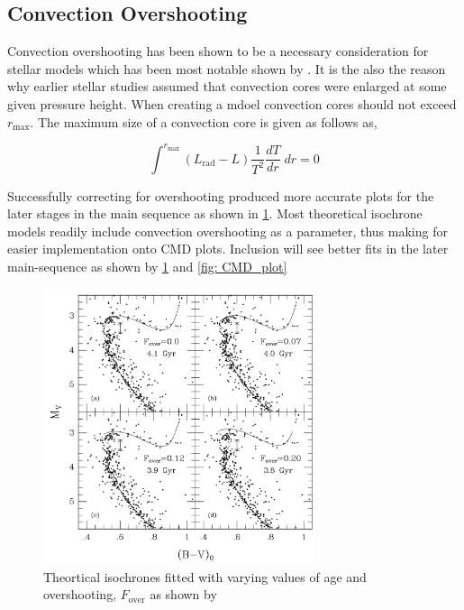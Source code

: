 \subsection{Convection Overshooting} \label{sec: convection_overshooting}

Convection overshooting has been shown to be a necessary consideration for stellar models which has been most notable shown by \cite{Overshooting_Vandenberg}. It is the also the reason why earlier stellar studies assumed that convection cores were enlarged at some given pressure height. When creating a mdoel convection cores should not exceed $r_{\text{max}}$. The maximum size of a convection core is given as follows as, 

\begin{equation}
    \int^{r_{\text{max}}} (L_{\text{rad}} - L) \frac{1}{T^2} \frac{dT}{dr} \; dr = 0 
\end{equation}

Successfully correcting for overshooting produced more accurate plots for the later stages in the main sequence as shown in \cref{fig: convection_overshooting}. Most theoretical isochrone models readily include convection overshooting as a parameter, thus making for easier implementation onto CMD plots. Inclusion will see better fits in the later main-sequence as shown by \cref{fig: convection_overshooting} and \cref{fig: CMD_plot}

\begin{figure}[h!]
    \centering
    \includegraphics[width = 8cm]{figures/CMD_convectio_overshooting.png}
    \caption{Theortical isochrones fitted with varying values of age and overshooting, $F_{\text{over}}$ as shown by \textcite{1985_Vandenberg}}
    \label{fig: convection_overshooting}
\end{figure}

